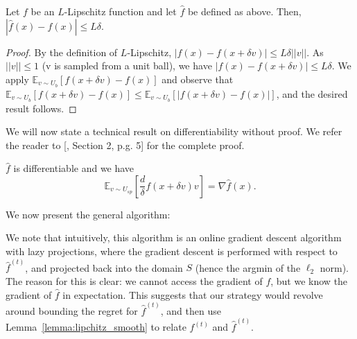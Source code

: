 \begin{lemma}\label{lemma:lipchitz_smooth}
Let $f$ be an $L$-Lipschitz function and let $\hat{f}$ be defined as above. Then, $|\hat{f}(x) - f(x)| \leq L \delta$.
\end{lemma}
\begin{proof}
    By the definition of $L$-Lipschitz, $|f(x) - f(x + \delta v)| \leq L \delta ||v||$. As $||v|| \leq 1$ (v is sampled from a unit ball), we have $|f(x) - f(x + \delta v)| \leq L\delta$. We apply $\mathbb{E}_{v \sim U_b}[f(x + \delta v) - f(x)]$ and observe that $\mathbb{E}_{v \sim U_b}[f(x + \delta v) - f(x)] \leq \mathbb{E}_{v \sim U_b}[|f(x + \delta v) - f(x)|]$, and the desired result follows.
\end{proof}
\noindent We will now state a technical result on differentiability without proof. We refer the reader to [\cite{2005Flaxman}, Section 2, p.g. 5] for the complete proof.
\begin{lemma}\label{lemma:diff_smooth}
    $\hat{f}$ is differentiable and we have
    $$\mathbb{E}_{v \sim U_{sp}}\left[ \frac{d}{\delta}f(x + \delta v)v \right] = \nabla \hat{f}(x).$$
\end{lemma}
\noindent We now present the general algorithm:
\begin{center}
\end{center}
We note that intuitively, this algorithm is an online gradient descent algorithm with lazy projections, where the gradient descent is performed with respect to $\hat{f}^{(t)}$, and projected back into the domain $S$ (hence the argmin of the $\ell_2$ norm). The reason for this is clear: we cannot access the gradient of $f$, but we know the gradient of $\hat{f}$ in expectation. This suggests that our strategy would revolve around bounding the regret for $\hat{f}^{(t)}$, and then use Lemma~\ref{lemma:lipchitz_smooth} to relate $f^{(t)}$ and $\hat{f}^{(t)}$.
